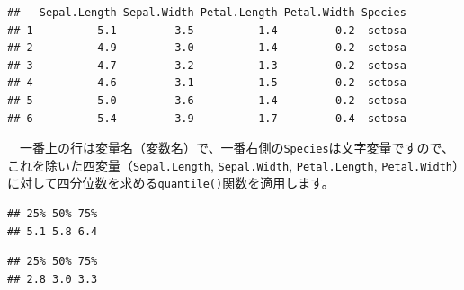 \documentclass[
  12pt,
]{book}
\newenvironment{Shaded}{\begin{snugshade}}{\end{snugshade}}
\newcommand{\AttributeTok}[1]{\textcolor[rgb]{0.77,0.63,0.00}{#1}}
\newcommand{\FloatTok}[1]{\textcolor[rgb]{0.00,0.00,0.81}{#1}}
\newcommand{\FunctionTok}[1]{\textcolor[rgb]{0.00,0.00,0.00}{#1}}
\newcommand{\NormalTok}[1]{#1}
\newcommand{\SpecialCharTok}[1]{\textcolor[rgb]{0.00,0.00,0.00}{#1}}
\begin{document}
\begin{verbatim}
##   Sepal.Length Sepal.Width Petal.Length Petal.Width Species
## 1          5.1         3.5          1.4         0.2  setosa
## 2          4.9         3.0          1.4         0.2  setosa
## 3          4.7         3.2          1.3         0.2  setosa
## 4          4.6         3.1          1.5         0.2  setosa
## 5          5.0         3.6          1.4         0.2  setosa
## 6          5.4         3.9          1.7         0.4  setosa
\end{verbatim}

　一番上の行は変量名（変数名）で、一番右側の\texttt{Species}は文字変量ですので、これを除いた四変量（\texttt{Sepal.Length}, \texttt{Sepal.Width}, \texttt{Petal.Length}, \texttt{Petal.Width}）に対して四分位数を求める\texttt{quantile()}関数を適用します。

\begin{Shaded}
\end{Shaded}

\begin{verbatim}
## 25% 50% 75% 
## 5.1 5.8 6.4
\end{verbatim}

\begin{Shaded}
\end{Shaded}

\begin{verbatim}
## 25% 50% 75% 
## 2.8 3.0 3.3
\end{verbatim}

\begin{Shaded}
\end{Shaded}
\end{document}
